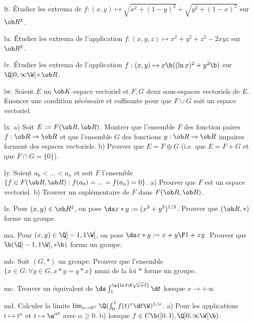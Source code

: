 \exo [Level=2,Fight=1,Learn=1,Type=\Exercices,Field=\Extrema,Origin=] lt. 
Étudier les extrema de $f:(x,y)\mapsto\sqrt{x^2+(1-y)^2}+\sqrt{y^2+(1-x)^2}$ sur $\ob R^2$. 

\exo [Level=2,Fight=1,Learn=1,Type=\Exercices,Field=\Extrema,Origin=] lu. 
Étudier les extrema de l'application $f:(x,y,z)\mapsto x^2+y^2+z^2-2xyz$ sur $\ob R^2$. 

\exo [Level=2,Fight=1,Learn=1,Type=\Exercices,Field=\Extrema,Origin=] lv. 
Étudier les extrema de l'application $f:(x,y)\mapsto x\b((\ln x)^2 +y^2\b)$ sur $\Q]0,\infty\W[\times\ob R$. 

\exo [Level=1,Fight=1,Learn=1,Type=\Exercices,Field=\EspacesVectoriels,Origin=] lw. 
Soient $E$ un $\ob K$-espace vectoriel et $F,G$ deux sous-espaces vectoriels de $E$. Enoncer une condition nécéssaire et suffisante pour que $F\cup G$ 
soit un espace vectoriel. 

\exo [Level=1,Fight=1,Learn=1,Type=\Exercices,Field=\EspacesVectoriels,Origin=] lx. 
a) Soit $E:=\sc F(\ob R,\ob R)$. Montrer que l'ensemble $F$ des fonction paires $f:\ob R\to\ob R$ 
et que l'ensemble $G$ des fonctions $g:\ob R\to\ob R$ impaires
forment des espaces vectoriels. \pn 
b) Prouver que $E=F\oplus G$ (i.e. que $E=F+G$ et que $F\cap G=\{0\}$). 

\exo [Origin=,Level=1,Fight=1,Learn=2,Type=\Colles,Field=\EspacesVectoriels] ly. 
Soient $a_0<...<a_n$ et soit $F$ l'ensemble $\{f\in\sc F(\ob R,\ob R):f(a_0)=...=f(a_n)=0\}$. \pn
a) Prouver que $F$ est un espace vectoriel. \pn
b) Trouver un suplémentaire de $F$ dans $\sc F(\ob R,\ob R)$. 


\exo [Level=1,Fight=1,Learn=1,Type=\Exercices,Field=\Groupes,Origin=] lz. 
Pour $(x,y)\in\ob R^2$, on pose $\ds x*y:=(x^3+y^3)^{1/3}$. 
Prouver que $(\ob R,*)$ forme un groupe. 

\exo [Level=1,Fight=1,Learn=1,Type=\Exercices,Field=\Groupes,Origin=] ma. 
Pour $(x,y)\in\Q]-1,1\W[$, on pose $\ds x*y:={x+y\F1+xy}$. Prouver que $\b(\Q]-1,1\W[,*\b)$ forme un groupe. 

\exo [Level=1,Fight=1,Learn=1,Type=\Exercices,Field=\Groupes,Origin=] mb. 
Soit $(G,*)$ un groupe. Prouver que l'ensemble $\{x\in G:\forall y\in G, x*y=y*x\}$ muni de la loi $*$ 
forme un groupe. 

\exo [Level=2,Fight=1,Learn=1,Type=\Exercices,Field=\FonctionsDéfiniesParUneIntégrale,Origin=] mc. 
Trouver un équivalent de $\ds \int_1^\e{\ln t\F\sqrt{x+t}}\d t$ lorsque $x\to+\infty$

\exo [Level=1,Fight=3,Learn=1,Type=\Exercices,Field=\Intégration,Origin=] md. 
Calculer la limite $\lim_{x\to 0^+}\Q(\int_0^1f(t)^x\d t\W)^{1/x}$. \pn
a) Pour les applications $t\mapsto t^\alpha$ et $t\mapsto \e^{\alpha t}$ avec $\alpha\ge0$. \pn
b) lorsque $f\in\sc C\b([0,1],\Q]0,\infty\W[\b)$. 

